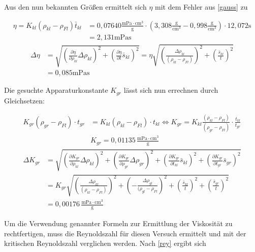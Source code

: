 Aus den nun bekannten Größen ermittelt sich $\eta$ mit dem Fehler aus \eqref{gauss} zu

\begin{align}
 \nonumber
 \eta = K_{kl}(\rho_{kl}-\rho_{Fl}) \bar t_{kl} &= 0,07640 \frac{\text{mPa}\cdot\text{cm}^3}{\text{g}} \cdot \left(3,308\frac{\text{g}}{\text{cm$^3$}} - 0,998 \frac{\text{g}}{\text{cm$^3$}}\right)\cdot 12,072 \text{s}\\
 &= 2,131 \text{mPas}
\end{align}
\begin{align}
\nonumber
 \Delta \eta &= \sqrt{\left(\frac{\partial \eta}{\partial \rho_{kl}}\Delta \rho_{kl}\right)^2 + \left(\frac{\partial \eta}{\partial t} \bar s_{kl}\right)^2} = \eta \sqrt{\left(\frac{\Delta \rho_{kl}}{(\rho_{kl}-\rho_{Fl})}\right)^2 + \left(\frac{\bar s_{kl}}{t}\right)^2} \\
 &= 0,085 \text{mPas}
\end{align}

Die gesuchte Apparaturkonstante $K_{gr}$ lässt sich nun errechnen durch Gleichsetzen:

\begin{align}
 \nonumber
 K_{gr}(\rho_{gr} - \rho_{Fl})\cdot t_{gr} &= K_{kl}(\rho_{kl} - \rho_{Fl})\cdot t_{kl} \Leftrightarrow K_{gr} = K_{kl}\frac{(\rho_{kl} - \rho_{Fl})}{(\rho_{gr} - \rho_{Fl})}\cdot\frac{t_{kl}}{t_{gr}}\\
 &K_{gr} = 0,01135\, \frac{\text{mPa}\cdot\text{cm}^3}{\text{g}}
\end{align}
\begin{align}
 \nonumber
\Delta K_{gr} &= \sqrt{\left(\frac{\partial K_{gr}}{\partial \rho_{kl}}\Delta \rho_{kl} \right)^2 + \left(\frac{\partial K_{gr}}{\partial \rho_{gr}}\Delta \rho_{gr} \right)^2 + \left(\frac{\partial K_{gr}}{\partial t_{kl}} \bar s_{kl} \right)^2 + \left(\frac{\partial K_{gr}}{\partial t_{gr}} \bar s_{gr} \right)^2}\\
 \nonumber
 &= K_{gr} \sqrt{\left(\frac{\Delta \rho_{kl}}{(\rho_{kl}-\rho_{Fl})} \right)^2 + \left(-\frac{\Delta \rho_{gl}}{(\rho_{gl}-\rho_{Fl}} \right)^2 + \left(\frac{\bar s_{kl}}{t} \right)^2 + \left(\frac{\bar s_{gr}}{t} \right)^2}\\
 &= 0,00176 \, \frac{\text{mPa}\cdot\text{cm}^3}{\text{g}}
\end{align}


Um die Verwendung genannter Formeln zur Ermittlung der Viskosität zu rechtfertigen, muss die Reynoldszahl für diesen Versuch ermittelt und mit 
der kritischen Reynoldszahl verglichen werden. Nach \eqref{rey} ergibt sich

